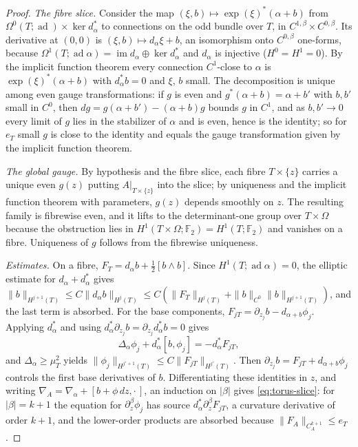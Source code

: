 \documentclass[11pt]{amsart}
\theoremstyle{definition}
\theoremstyle{remark}
\theoremstyle{plain}
\numberwithin{equation}{section}
\newcommand{\FF}{\mathbb{F}_2}
\newcommand{\ad}{\operatorname{ad}}
\newcommand{\im}{\operatorname{im}}
\begin{document}
\begin{proof}
\emph{The fibre slice.} Consider the map $(\xi,b)\mapsto\exp(\xi)^*(\alpha+b)$
from $\Omega^0(T;\ad)\times\ker d_\alpha^*$ to connections on the odd bundle over
$T$, in $C^{1,\beta}\times C^{0,\beta}$. Its derivative at $(0,0)$ is
$(\xi,b)\mapsto d_\alpha\xi+b$, an isomorphism onto $C^{0,\beta}$ one-forms, because
$\Omega^1(T;\ad\alpha)=\im d_\alpha\oplus\ker d_\alpha^*$ and $d_\alpha$ is injective
($H^0=H^1=0$). By the implicit function theorem every connection $C^1$-close to
$\alpha$ is $\exp(\xi)^*(\alpha+b)$ with $d_\alpha^*b=0$ and $\xi$, $b$ small. The
decomposition is unique among even gauge transformations: if $g$ is even and
$g^*(\alpha+b)=\alpha+b'$ with $b,b'$ small in $C^0$, then $dg=g(\alpha+b')-(\alpha+b)g$
bounds $g$ in $C^1$, and as $b,b'\to0$ every limit of $g$ lies in the stabilizer of
$\alpha$ and is even, hence is the identity; so for $e_T$ small $g$ is close to
the identity and equals the gauge transformation given by the implicit function
theorem.

\emph{The global gauge.} By hypothesis and the fibre slice, each fibre
$T\times\{z\}$ carries a unique even $g(z)$ putting $A|_{T\times\{z\}}$ into the
slice; by uniqueness and the implicit function theorem with parameters, $g(z)$
depends smoothly on $z$. The resulting family is fibrewise even, and it lifts to
the determinant-one group over $T\times\Omega$ because the obstruction lies in
$H^1(T\times\Omega;\FF)=H^1(T;\FF)$ and vanishes on a fibre. Uniqueness of $g$ follows
from the fibrewise uniqueness.

\emph{Estimates.} On a fibre, $F_T=d_\alpha b+\tfrac12[b\wedge b]$. Since
$H^1(T;\ad\alpha)=0$, the elliptic estimate for $d_\alpha+d_\alpha^*$ gives
$\|b\|_{H^{j+1}(T)}\le C\|d_\alpha b\|_{H^j(T)}\le C(\|F_T\|_{H^j(T)}+\|b\|_{C^0}\|b\|_{H^{j+1}(T)})$,
and the last term is absorbed. For the base components,
$F_{jT}=\partial_{z_j}b-d_{\alpha+b}\phi_j$. Applying $d_\alpha^*$ and using
$d_\alpha^*\partial_{z_j}b=\partial_{z_j}d_\alpha^*b=0$ gives
\[
\Delta_\alpha\phi_j+d_\alpha^*[b,\phi_j]=-d_\alpha^*F_{jT},
\]
and $\Delta_\alpha\ge\mu_T^2$ yields $\|\phi_j\|_{H^{j'+1}(T)}\le C\|F_{jT}\|_{H^{j'}(T)}$.
Then $\partial_{z_j}b=F_{jT}+d_{\alpha+b}\phi_j$ controls the first base derivatives
of $b$. Differentiating these identities in $z$, and writing
$\nabla_A=\nabla_\alpha+[b+\phi\,dz,\cdot\,]$, an induction on $|\beta|$ gives
\eqref{eq:torus-slice}: for $|\beta|=k+1$ the equation for $\partial_z^\beta\phi_j$ has
source $d_\alpha^*\partial_z^\beta F_{jT}$, a curvature derivative of order $k+1$, and
the lower-order products are absorbed because $\|F_A\|_{C^{k+1}_A}\le e_T$.
\end{proof}
\end{document}
